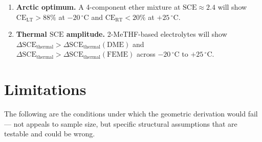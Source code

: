 \documentclass[12pt,letterpaper]{article}
\newcommand{\mSCE}{\mathrm{SCE}}
\newcommand{\mCERT}{\mathrm{CE}_{\mathrm{RT}}}
\newcommand{\mCELT}{\mathrm{CE}_{\mathrm{LT}}}
\begin{document}
\begin{enumerate}
  \item \textbf{Arctic optimum.}
        A 4-component ether mixture at
        $\mSCE \approx 2.4$ will show
        $\mCELT > 88\%$
        at $-20\,^{\circ}\mathrm{C}$ and
        $\mCERT < 20\%$
        at $+25\,^{\circ}\mathrm{C}$.

  \item \textbf{Thermal $\mSCE$ amplitude.}
        2-MeTHF-based electrolytes will show
        $\Delta\mSCE_{\mathrm{thermal}} >
        \Delta\mSCE_{\mathrm{thermal}}(\text{DME})$
        and
        $\Delta\mSCE_{\mathrm{thermal}} >
        \Delta\mSCE_{\mathrm{thermal}}(\text{FEME})$
        across
        $-20\,^{\circ}\mathrm{C}$
        to $+25\,^{\circ}\mathrm{C}$.
\end{enumerate}

\section{Limitations}
\label{sec:limitations}

The following are the conditions under which the geometric
derivation would fail --- not appeals to sample size,
but specific structural assumptions that are testable
and could be wrong.
\end{document}
